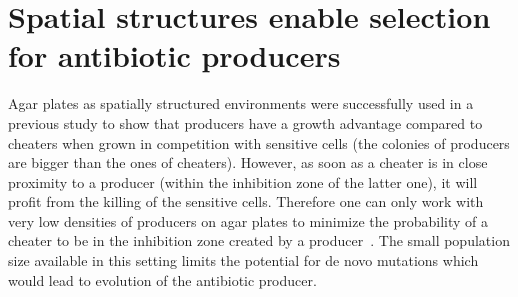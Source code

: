 \section{Spatial structures enable selection for antibiotic producers}
\label{sec:spatial_structure}

Agar plates as spatially structured environments were successfully used in a previous study to show that producers have a growth advantage compared to cheaters when grown in competition with sensitive cells (the colonies of producers are bigger than the ones of cheaters). However, as soon as a cheater is in close proximity to a producer (within the inhibition zone of the latter one), it will profit from the killing of the sensitive cells. Therefore one can only work with very low densities of producers on agar plates to minimize the probability of a cheater to be in the inhibition zone created by a producer~\cite{Gerardin2016-ac}. The small population size available in this setting limits the potential for de novo mutations which would lead to evolution of the antibiotic producer.

